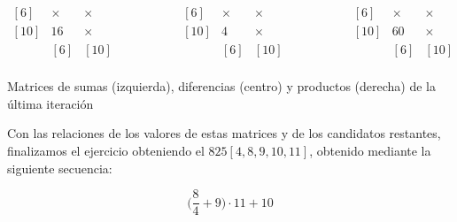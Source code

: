 \begin{center}
$\begin{matrix}
[6]  & \times & \times \\
[10] & 16     & \times \\
     &   [6]  &  [10]  \\
\end{matrix}
\ \ \ \ \ \ \ \ \ \ \ \ \ \ \ \ \ \ \ \ \ \ \begin{matrix}
[6]  & \times & \times \\
[10] & 4      & \times \\
     &   [6]  &  [10]  \\
\end{matrix}
\ \ \ \ \ \ \ \ \ \ \ \ \ \ \ \ \ \ \ \ \ \ \begin{matrix}
[6]  & \times & \times \\
[10] & 60     & \times \\
     &   [6]  &  [10]  \\
\end{matrix}$

Matrices de sumas (izquierda), diferencias (centro) y productos (derecha) de la última iteración
\end{center}

Con las relaciones de los valores de estas matrices y de los candidatos restantes, finalizamos el ejercicio obteniendo el  $825[4,8,9,10,11]$, obtenido mediante la siguiente secuencia:

\begin{center}
\[\bigg(\frac{8}{4}+9\bigg)\cdot11+10\]
\end{center}
